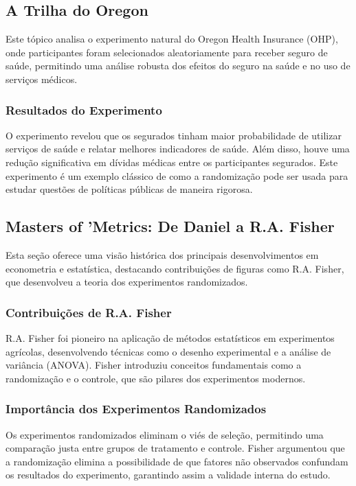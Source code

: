 \documentclass[a4paper,12pt]{article}[abntex2]
\begin{document}
\subsection{A Trilha do Oregon}

Este tópico analisa o experimento natural do Oregon Health Insurance (OHP), onde participantes foram selecionados aleatoriamente para receber seguro de saúde, permitindo uma análise robusta dos efeitos do seguro na saúde e no uso de serviços médicos.

\subsubsection*{Resultados do Experimento}

O experimento revelou que os segurados tinham maior probabilidade de utilizar serviços de saúde e relatar melhores indicadores de saúde. Além disso, houve uma redução significativa em dívidas médicas entre os participantes segurados. Este experimento é um exemplo clássico de como a randomização pode ser usada para estudar questões de políticas públicas de maneira rigorosa.

\subsection*{Masters of 'Metrics: De Daniel a R.A. Fisher}

Esta seção oferece uma visão histórica dos principais desenvolvimentos em econometria e estatística, destacando contribuições de figuras como R.A. Fisher, que desenvolveu a teoria dos experimentos randomizados.

\subsubsection*{Contribuições de R.A. Fisher}

R.A. Fisher foi pioneiro na aplicação de métodos estatísticos em experimentos agrícolas, desenvolvendo técnicas como o desenho experimental e a análise de variância (ANOVA). Fisher introduziu conceitos fundamentais como a randomização e o controle, que são pilares dos experimentos modernos.

\subsubsection*{Importância dos Experimentos Randomizados}

Os experimentos randomizados eliminam o viés de seleção, permitindo uma comparação justa entre grupos de tratamento e controle. Fisher argumentou que a randomização elimina a possibilidade de que fatores não observados confundam os resultados do experimento, garantindo assim a validade interna do estudo.
\end{document}
